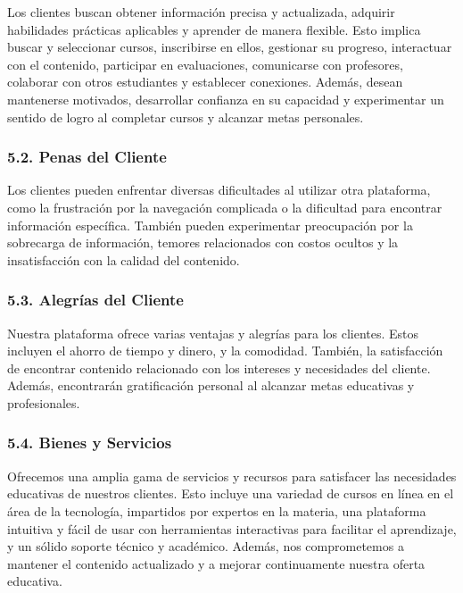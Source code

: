 \documentclass[
]{article}
\begin{document}
Los clientes buscan obtener información precisa y actualizada, adquirir
habilidades prácticas aplicables y aprender de manera flexible. Esto
implica buscar y seleccionar cursos, inscribirse en ellos, gestionar su
progreso, interactuar con el contenido, participar en evaluaciones,
comunicarse con profesores, colaborar con otros estudiantes y establecer
conexiones. Además, desean mantenerse motivados, desarrollar confianza
en su capacidad y experimentar un sentido de logro al completar cursos y
alcanzar metas personales.

\subsubsection{5.2. Penas del Cliente}\label{penas-del-cliente}

Los clientes pueden enfrentar diversas dificultades al utilizar otra
plataforma, como la frustración por la navegación complicada o la
dificultad para encontrar información específica. También pueden
experimentar preocupación por la sobrecarga de información, temores
relacionados con costos ocultos y la insatisfacción con la calidad del
contenido.

\subsubsection{5.3. Alegrías del Cliente}\label{alegruxedas-del-cliente}

Nuestra plataforma ofrece varias ventajas y alegrías para los clientes.
Estos incluyen el ahorro de tiempo y dinero, y la comodidad. También, la
satisfacción de encontrar contenido relacionado con los intereses y
necesidades del cliente. Además, encontrarán gratificación personal al
alcanzar metas educativas y profesionales.

\subsubsection{5.4. Bienes y Servicios}\label{bienes-y-servicios}

Ofrecemos una amplia gama de servicios y recursos para satisfacer las
necesidades educativas de nuestros clientes. Esto incluye una variedad
de cursos en línea en el área de la tecnología, impartidos por expertos
en la materia, una plataforma intuitiva y fácil de usar con herramientas
interactivas para facilitar el aprendizaje, y un sólido soporte técnico
y académico. Además, nos comprometemos a mantener el contenido
actualizado y a mejorar continuamente nuestra oferta educativa.
\end{document}
